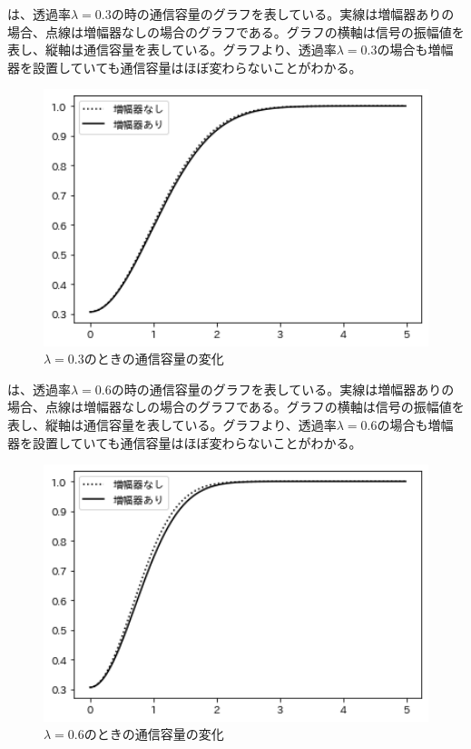 \newpage
{}は、透過率$\lambda=0.3$の時の通信容量のグラフを表している。実線は増幅器ありの場合、点線は増幅器なしの場合のグラフである。グラフの横軸は信号の振幅値を表し、縦軸は通信容量を表している。グラフより、透過率$\lambda=0.3$の場合も増幅器を設置していても通信容量はほぼ変わらないことがわかる。

    \begin{figure}[H]
        \centering   
        \includegraphics[width=1\textwidth]{img/Fig5_4.png}
        \caption[sample image (png)]{$\lambda=0.3$のときの通信容量の変化}
        \label{Fig5_4}
    \end{figure}

\newpage
{}は、透過率$\lambda=0.6$の時の通信容量のグラフを表している。実線は増幅器ありの場合、点線は増幅器なしの場合のグラフである。グラフの横軸は信号の振幅値を表し、縦軸は通信容量を表している。グラフより、透過率$\lambda=0.6$の場合も増幅器を設置していても通信容量はほぼ変わらないことがわかる。

    \begin{figure}[H]
        \centering   
        \includegraphics[width=1\textwidth]{img/Fig5_5.png}
        \caption[sample image (png)]{$\lambda=0.6$のときの通信容量の変化}
        \label{Fig5_5}
    \end{figure}


